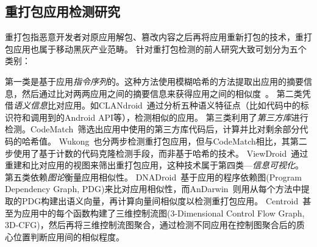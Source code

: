 \subsection{重打包应用检测研究}
\label{sec:repackaging}
重打包指恶意开发者对原应用解包、篡改内容之后再将应用重新打包的技术，重打包应用也属于移动黑灰产业范畴。
针对重打包检测的前人研究大致可划分为五个类别：

第一类是基于应用\textit{指令序列}的。这种方法使用模糊哈希的方法提取出应用的摘要信息，然后通过比对两两应用之间的摘要信息来获得应用之间的相似度~\cite{DroidMOSS, Zheng2013DroidAnalyticsA}。
第二类凭借\textit{语义信息}比对应用。如CLANdroid~\cite{CLANdroid}通过分析五种语义特征点（比如代码中的标识符和调用到的Android API等），检测相似的应用。
第三类利用了\textit{第三方库}进行检测。CodeMatch~\cite{CodeMatch}筛选出应用中使用的第三方库代码后，计算并比对剩余部分代码的哈希值。
Wukong~\cite{Wukong}也分两步检测重打包应用，但与CodeMatch相比，其第二步使用了基于计数的代码克隆检测手段，而非基于哈希的技术。
ViewDroid~\cite{ViewDroid}通过重建和比对应用的视图来筛出重打包应用，这种技术属于第四类---\textit{信息可视化}。
第五类依赖\textit{图论}衡量应用相似性。
DNADroid~\cite{DNADroid}基于应用的程序依赖图(Program Dependency Graph, PDG)来比对应用相似性，而AnDarwin~\cite{AnDarwin}则用从每个方法中提取的PDG构建出语义向量，再计算向量间相似度以检测重打包应用。
Centroid~\cite{Centroid}甚至为应用中的每个函数构建了三维控制流图(3-Dimensional Control Flow Graph, 3D-CFG)，然后再将三维控制流图聚合，通过检测不同应用在控制图聚合后的质心位置判断应用间的相似程度。

